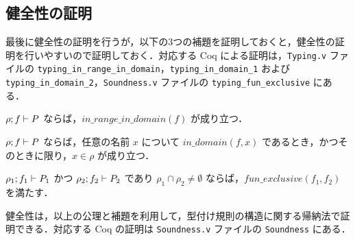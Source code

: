 
\subsection{健全性の証明}


最後に健全性の証明を行うが，以下の3つの補題を証明しておくと，健全性の証明を行いやすいので証明しておく．対応する Coq による証明は，\texttt{Typing.v} ファイルの \texttt{typing\_in\_range\_in\_domain}，\texttt{typing\_in\_domain\_1} および \texttt{typing\_in\_domain\_2}，\texttt{Soundness.v} ファイルの \texttt{typing\_fun\_exclusive} にある．


\begin{lem}[定義域と値域の一致]
  \label{lemma:typing_range_domain}
  $\rho ; f \vdash P$ ならば，$in\_range\_in\_domain(f)$ が成り立つ．
\end{lem}

\begin{lem}
  \label{lemma:typing_recep_domain}
  $\rho ; f \vdash P$ ならば，任意の名前 $ x $ について $in\_domain(f, x) $ であるとき，かつそのときに限り，$ x \in \rho $ が成り立つ．
\end{lem}

\begin{lem}
  \label{lemma:typing_fun_exclusive}
  $\rho_1 ; f_1 \vdash P_1$ かつ $\rho_2 ; f_2 \vdash P_2$ であり $ \rho_1 \cap \rho_2 \neq \emptyset $ ならば，$fun\_exclusive(f_1, f_2)$ を満たす．
\end{lem}

健全性は，以上の公理と補題を利用して，型付け規則の構造に関する帰納法で証明できる．対応する Coq の証明は \texttt{Soundness.v} ファイルの \texttt{Soundness} にある．




